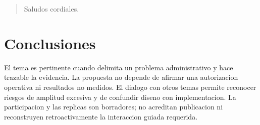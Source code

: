 {\begin{quote}
Saludos cordiales.
\end{quote}
\section{Conclusiones}
El tema es pertinente cuando delimita un problema administrativo y hace trazable la evidencia. La propuesta no depende de afirmar una autorizacion operativa ni resultados no medidos. El dialogo con otros temas permite reconocer riesgos de amplitud excesiva y de confundir diseno con implementacion. La participacion y las replicas son borradores; no acreditan publicacion ni reconstruyen retroactivamente la interaccion guiada requerida.
}
\def\seminarioreferencias{\clearpage\section*{Referencias}
Instituto Tecnologico Superior de Cajeme. (s. f.). \emph{Maestria en Gestion Administrativa}. \url{https://www.itesca.edu.mx/modulos/oferta/posgrado/mgad.php}\par\medskip
Instituto Tecnologico Superior de Cajeme. (2026). \emph{Tarea 7: Eleccion del tema y titulo de investigacion} [Consigna de foro]. \url{https://cursos3.e-itesca.edu.mx/mod/forum/view.php?id=2906}
}
